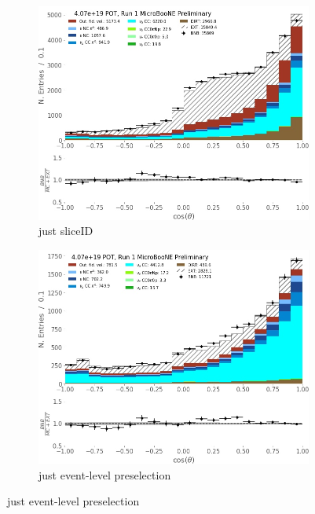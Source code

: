 \begin{figure}[ht] 
\begin{center}
    \begin{subfigure}[b]{0.45\textwidth}
    \centering
    \includegraphics[width=1.00\textwidth]{NuMuCCsel/Images/Ryan/Run1_costheta_sliceID.jpg}
    \caption{\label{fig:NuMUCCsel:ryan:trklenSliceID} just sliceID}
    \end{subfigure}
    \begin{subfigure}[b]{0.45\textwidth}
    \centering
    \includegraphics[width=1.00\textwidth]{NuMuCCsel/Images/Ryan/Run1_costheta_evtsel.jpg}
    \caption{\label{fig:NuMUCCsel:ryan:trklenEvt} just event-level preselection}

\end{subfigure}
\end{center}
\end{figure}

